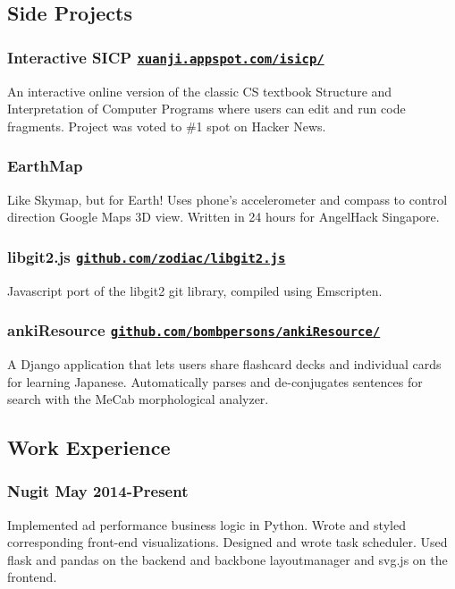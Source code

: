 \documentclass[letterpaper]{article}
\begin{document}
\begin{center}
\section*{Side Projects}
\end{center}
\subsubsection*{Interactive SICP \hfill \href{http://xuanji.appspot.com/isicp/}{\tt xuanji.appspot.com/isicp/}}
An interactive online version of the classic CS textbook Structure and Interpretation of Computer Programs where users can edit and run code fragments. Project was voted to \#1 spot on Hacker News.

\subsubsection*{EarthMap}
Like Skymap, but for Earth! Uses phone's accelerometer and compass to control direction Google Maps 3D view. Written in 24 hours for AngelHack Singapore.

\subsubsection*{libgit2.js \hfill \href{https://github.com/zodiac/libgit2.js}{\tt github.com/zodiac/libgit2.js}}
Javascript port of the libgit2 git library, compiled using Emscripten.

\subsubsection*{ankiResource \hfill \href{https://github.com/bombpersons/ankiResource}{\tt github.com/bombpersons/ankiResource/}}
A Django application that lets users share flashcard decks and individual cards for learning Japanese. Automatically parses and de-conjugates sentences for search with the MeCab morphological analyzer.

\vspace{1em}

\begin{center}
\section*{Work Experience}
\end{center}

\subsubsection*{Nugit \hfill May 2014-Present}
Implemented ad performance business logic in Python. Wrote and styled corresponding front-end visualizations. Designed and wrote task scheduler. Used flask and pandas on the backend and backbone layoutmanager and svg.js on the frontend.
\end{document}
